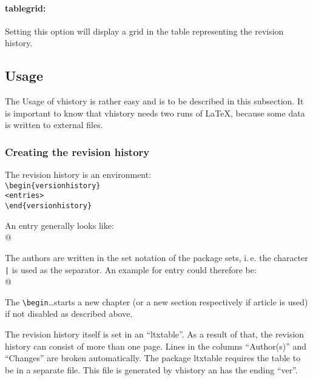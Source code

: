 \paragraph{tablegrid:} Setting this option will display a grid in the table representing the revision history.

\subsection{Usage}\label{usage}
The Usage of vhistory is rather easy and is to be described in this subsection.
It is important to know that vhistory needs two runs of \LaTeX, because some data is written to external files.

\subsubsection{Creating the revision history}\label{begin}
The revision history is an environment:\\
\mbox{}\hspace{2em}\verb|\begin{versionhistory}|\\
\mbox{}\hspace{2em}\verb|<entries>|\\
\mbox{}\hspace{2em}\verb|\end{versionhistory}|

An entry generally looks like:\\
\mbox{}\hspace{2em}\verb@{}@

The authors are written in the set notation of the package sets, i.\,e. the character \texttt{|} is used as the separator. An example for entry could therefore be:\\
\mbox{}\hspace{2em}\verb@{}@

The \verb|\begin|\ldots starts a new chapter (or a new section respectively if article is used) if not disabled as described above.

The revision history itself is set in an ``ltxtable''. As a result of that, the revision history can consist of more than one page. Lines in the columns ``Author(s)'' and ``Changes'' are broken automatically. The package ltxtable requires the table to be in a separate file. This file is generated by vhistory an has the ending ``ver''.

